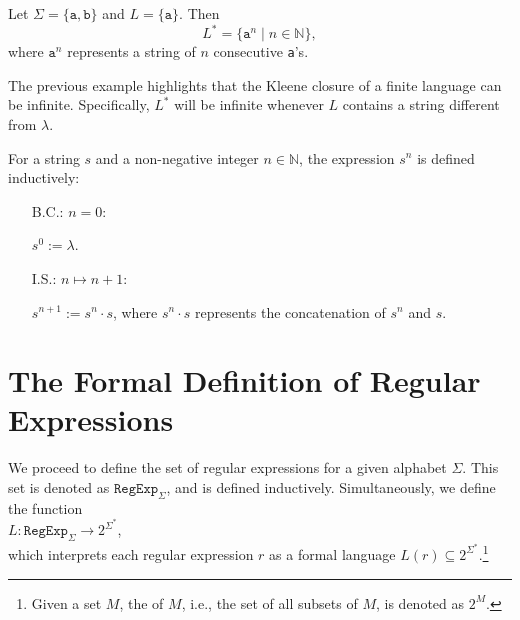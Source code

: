 \exampleEng
Let $ \Sigma = \{ \texttt{a}, \texttt{b} \} $ and $ L = \{ \texttt{a} \} $. Then
\[
L^* = \{ \texttt{a}^n \mid n \in \mathbb{N} \},
\]
where $ \texttt{a}^n $ represents a string of $ n $ consecutive \texttt{a}'s. \eox

The previous example highlights that the Kleene closure of a finite language can be infinite. Specifically, 
$L^*$ will be infinite whenever $L$ contains a string different from $\lambda$. 

\begin{Definition}
For a string $ s $ and a non-negative integer $ n \in \mathbb{N} $, the expression $ s^n $ is defined inductively:
\begin{enumerate}
\item[B.C.:] $ n = 0 $:

             $ s^0 := \lambda $.
\item[I.S.:] $ n \mapsto n + 1 $:

             $ s^{n+1} := s^n \cdot s $,  \quad where $ s^n \cdot s $ represents the concatenation of $ s^n $ and $ s $.
\eox
\end{enumerate}
\end{Definition}



\section{The Formal Definition of Regular Expressions}
We proceed to define the set of regular expressions for a given alphabet $ \Sigma $. This set is denoted as
$ \texttt{RegExp}_\Sigma $, and is defined inductively. Simultaneously, we define the function 
\\[0.2cm]
\hspace*{1.3cm}
$L: \texttt{RegExp}_\Sigma \rightarrow 2^{\Sigma^*}$,
\\[0.2cm]
which interprets each regular expression $ r $ as a formal language $ L(r) \subseteq 2^{\Sigma^*} $.\footnote{
  Given a set $ M $, the  of $ M $, i.e., the set of all subsets of $ M $, is denoted as $ 2^M $.
}
\pagebreak

